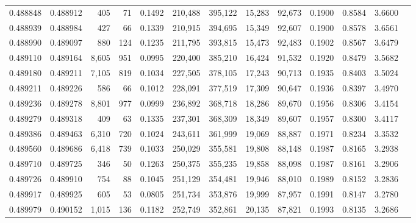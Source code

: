 \begin{tabular}{rrrrrrrrrrrrr}
0.488848 & 0.488912 &   405 &    71 &                                     0.1492 & 210,488 & 395,122 &  15,283 &  92,673 & 0.1900 & 0.8584 & 3.6600 \\
0.488939 & 0.488984 &   427 &    66 &                                     0.1339 & 210,915 & 394,695 &  15,349 &  92,607 & 0.1900 & 0.8578 & 3.6561 \\
0.488990 & 0.489097 &   880 &   124 &                                     0.1235 & 211,795 & 393,815 &  15,473 &  92,483 & 0.1902 & 0.8567 & 3.6479 \\
0.489110 & 0.489164 & 8,605 &   951 &                                     0.0995 & 220,400 & 385,210 &  16,424 &  91,532 & 0.1920 & 0.8479 & 3.5682 \\
0.489180 & 0.489211 & 7,105 &   819 &                                     0.1034 & 227,505 & 378,105 &  17,243 &  90,713 & 0.1935 & 0.8403 & 3.5024 \\
0.489211 & 0.489226 &   586 &    66 &                                     0.1012 & 228,091 & 377,519 &  17,309 &  90,647 & 0.1936 & 0.8397 & 3.4970 \\
0.489236 & 0.489278 & 8,801 &   977 &                                     0.0999 & 236,892 & 368,718 &  18,286 &  89,670 & 0.1956 & 0.8306 & 3.4154 \\
0.489279 & 0.489318 &   409 &    63 &                                     0.1335 & 237,301 & 368,309 &  18,349 &  89,607 & 0.1957 & 0.8300 & 3.4117 \\
0.489386 & 0.489463 & 6,310 &   720 &                                     0.1024 & 243,611 & 361,999 &  19,069 &  88,887 & 0.1971 & 0.8234 & 3.3532 \\
0.489560 & 0.489686 & 6,418 &   739 &                                     0.1033 & 250,029 & 355,581 &  19,808 &  88,148 & 0.1987 & 0.8165 & 3.2938 \\
0.489710 & 0.489725 &   346 &    50 &                                     0.1263 & 250,375 & 355,235 &  19,858 &  88,098 & 0.1987 & 0.8161 & 3.2906 \\
0.489726 & 0.489910 &   754 &    88 &                                     0.1045 & 251,129 & 354,481 &  19,946 &  88,010 & 0.1989 & 0.8152 & 3.2836 \\
0.489917 & 0.489925 &   605 &    53 &                                     0.0805 & 251,734 & 353,876 &  19,999 &  87,957 & 0.1991 & 0.8147 & 3.2780 \\
0.489979 & 0.490152 & 1,015 &   136 &                                     0.1182 & 252,749 & 352,861 &  20,135 &  87,821 & 0.1993 & 0.8135 & 3.2686 \\

\end{tabular}
